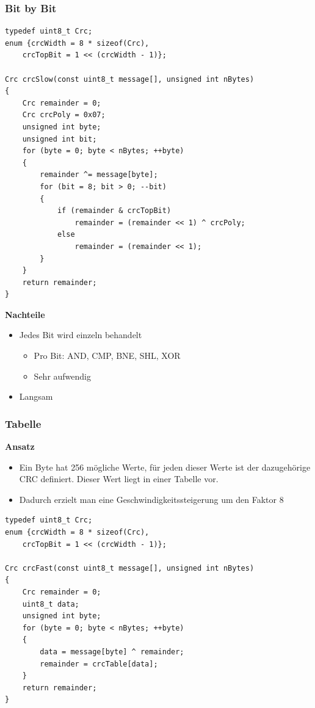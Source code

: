 \subsubsection{Bit by Bit}
\begin{lstlisting}[style=C]
typedef uint8_t Crc;
enum {crcWidth = 8 * sizeof(Crc),
	crcTopBit = 1 << (crcWidth - 1)};
	
Crc crcSlow(const uint8_t message[], unsigned int nBytes)
{
	Crc remainder = 0;
	Crc crcPoly = 0x07;
	unsigned int byte;
	unsigned int bit;
	for (byte = 0; byte < nBytes; ++byte)
	{
		remainder ^= message[byte];
		for (bit = 8; bit > 0; --bit)
		{
			if (remainder & crcTopBit)
				remainder = (remainder << 1) ^ crcPoly;
			else
				remainder = (remainder << 1);
		}
	}
	return remainder;
}
\end{lstlisting}

\textbf{Nachteile}
\begin{itemize}
	\item Jedes Bit wird einzeln behandelt
	\begin{itemize}
		\item Pro Bit: AND, CMP, BNE, SHL, XOR
		\item Sehr aufwendig	
	\end{itemize}
	\item Langsam
\end{itemize}


\subsubsection{Tabelle}
\textbf{Ansatz}
\begin{itemize}
	\item Ein Byte hat 256 mögliche Werte, für jeden dieser Werte ist der dazugehörige CRC definiert. Dieser Wert liegt in einer Tabelle vor.
	\item Dadurch erzielt man eine Geschwindigkeitssteigerung um den Faktor 8	
\end{itemize}

\begin{lstlisting}[style=C]
typedef uint8_t Crc;
enum {crcWidth = 8 * sizeof(Crc),
	crcTopBit = 1 << (crcWidth - 1)};
	
Crc crcFast(const uint8_t message[], unsigned int nBytes)
{
	Crc remainder = 0;
	uint8_t data;
	unsigned int byte;
	for (byte = 0; byte < nBytes; ++byte)
	{
		data = message[byte] ^ remainder;
		remainder = crcTable[data];
	}
	return remainder;
}
\end{lstlisting}






